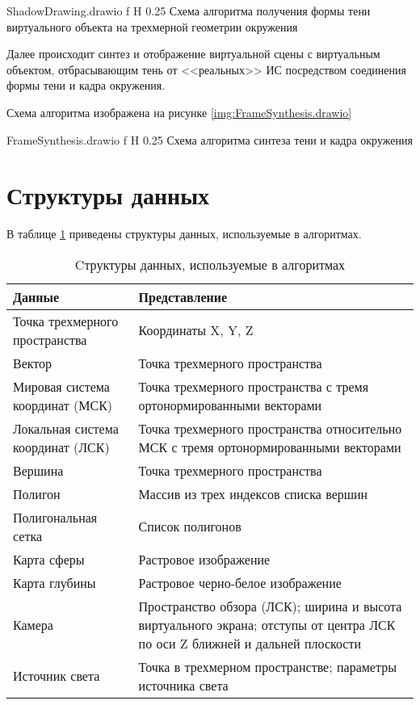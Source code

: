{ShadowDrawing.drawio}
{f}
{H}
{0.25\textwidth}
{Схема алгоритма получения формы тени виртуального объекта на трехмерной геометрии окружения}

Далее происходит синтез и отображение виртуальной сцены с виртуальным объектом, отбрасывающим тень от <<реальных>> ИС посредством соединения формы тени и кадра окружения.

Схема алгоритма изображена на рисунке \ref{img:FrameSynthesis.drawio}

{FrameSynthesis.drawio}
{f}
{H}
{0.25\textwidth}
{Схема алгоритма синтеза тени и кадра окружения}

\section{Структуры данных}

В таблице \ref{DataStructures} приведены структуры данных, используемые в алгоритмах.

\begin{table}[H]
	\caption{Cтруктуры данных, используемые в алгоритмах}
	\label{DataStructures}
	\begin{center}
		\begin{tabular}{| p{4 cm} | p{11 cm} |} 
			\hline
			Данные & Представление \\
			\hline
			Точка трехмерного пространства & Координаты X, Y, Z \\
			\hline
			Вектор & Точка трехмерного пространства  \\
			\hline
			Мировая система координат (МСК) & Точка трехмерного пространства с тремя ортонормированными векторами \\
			\hline
			Локальная система координат (ЛСК) & Точка трехмерного пространства относительно МСК с тремя ортонормированными векторами \\
			\hline
			Вершина & Точка трехмерного пространства \\
			\hline
			Полигон & Массив из трех индексов списка вершин \\
			\hline
			Полигональная сетка & Список полигонов \\
			\hline
			Карта сферы & Растровое изображение \\
			\hline
			Карта глубины & Растровое черно-белое изображение \\
			\hline
			Камера & Пространство обзора (ЛСК); ширина и высота виртуального экрана; отступы от центра ЛСК по оси Z ближней и дальней плоскости \\
			\hline
			Источник света & Точка в трехмерном пространстве; параметры источника света \\
			\hline
		\end{tabular}
	\end{center}
\end{table}

